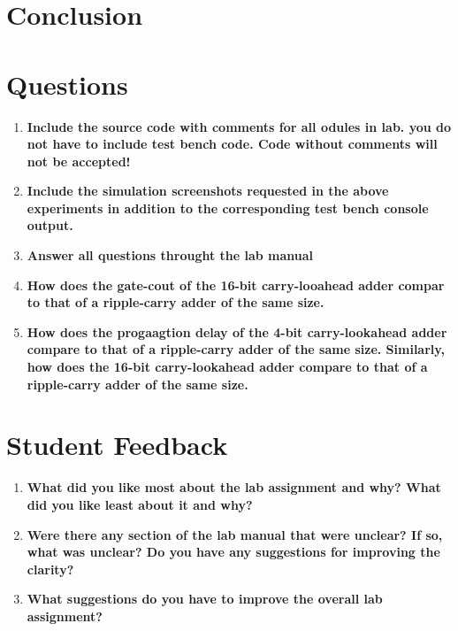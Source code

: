 \documentclass[a4paper,12pt]{article}
\begin{document}
\section*{Conclusion}


\section*{Questions}

\begin{enumerate}
  \item \textbf{Include the source code with comments for all odules in lab. you do not have to include test bench code. Code without comments will not be accepted!}
  \item \textbf{Include the simulation screenshots requested in the above experiments in addition to the corresponding test bench console output.}
  \item \textbf{Answer all questions throught the lab manual}
  \item \textbf{How does the gate-cout of the 16-bit carry-looahead adder compar to that of a ripple-carry adder of the same size.}
  \item \textbf{How does the progaagtion delay of the 4-bit carry-lookahead adder compare to that of a ripple-carry adder of the same size. Similarly, how does the 16-bit carry-lookahead adder compare to that of a ripple-carry adder of the same size.}
\end{enumerate}

\section*{Student Feedback}

\begin{enumerate}
  \item \textbf{What did you like most about the lab assignment and why? What did you like least about it and why?}
  \vspace{10pt}

  \item \textbf{Were there any section of the lab manual that were unclear? If so, what was unclear? Do you have any suggestions for improving the clarity?}
  \vspace{10pt}

  \item \textbf{What suggestions do you have to improve the overall lab assignment?}
  \vspace{10pt}

\end{enumerate}
\end{document}
